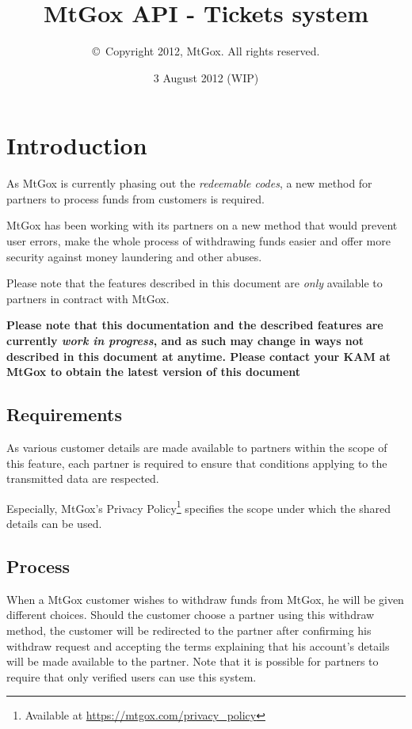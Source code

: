 \documentclass[a4paper,12pt]{article}
\title{MtGox API - Tickets system}
\author{\copyright~Copyright 2012, MtGox. All rights reserved.}
\date{3 August 2012 (WIP)}
\begin{document}
\maketitle

\tableofcontents

\section{Introduction}

As MtGox is currently phasing out the \emph{redeemable codes}, a new method
for partners to process funds from customers is required.

MtGox has been working with its partners on a new method that would prevent
user errors, make the whole process of withdrawing funds easier and offer more
security against money laundering and other abuses.

Please note that the features described in this document are \emph{only}
available to partners in contract with MtGox.

\textbf{Please note that this documentation and the described features are
currently \emph{work in progress}, and as such may change in ways not
described in this document at anytime. Please contact your KAM at MtGox to
obtain the latest version of this document}

\subsection{Requirements}

As various customer details are made available to partners within the scope
of this feature, each partner is required to ensure that conditions applying
to the transmitted data are respected.

Especially, MtGox's Privacy Policy\footnote{Available at
\url{https://mtgox.com/privacy\_policy}} specifies the scope under which the
shared details can be used.

\subsection{Process}

When a MtGox customer wishes to withdraw funds from MtGox, he will be given
different choices. Should the customer choose a partner using this withdraw
method, the customer will be redirected to the partner after confirming his
withdraw request and accepting the terms explaining that his account's details
will be made available to the partner. Note that it is possible for partners
to require that only verified users can use this system.
\end{document}

